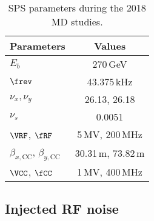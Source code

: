 \begin{table}[!hbt]
    \centering
    \caption{SPS parameters during the 2018 MD studies.}
    \begin{tabular}{lc}
        \toprule
        \textbf{Parameters} & \textbf{Values}\\
        \midrule
           $E_b$  & 270\,GeV   \\ %
           $\frev$  & 43.375\,kHz  \\ %
           $\nu_x, \nu_y$    & 26.13, 26.18  \\ %
            $\nu_s$ & 0.0051   \\
            $\VRF$, $\fRF$ & 5\,MV, 200\,MHz \\
            $\beta_{x, \text{CC}}$, $\beta_{y,\text{CC}}$ &  30.31\,m, 73.82\,m \\
            $\VCC$, $\fCC$ & 1\,MV, 400\,MHz \\
       \bottomrule
    \end{tabular}
    \label{tab:SPS_MD_params}
 \end{table}

 \subsection{Injected RF noise} 